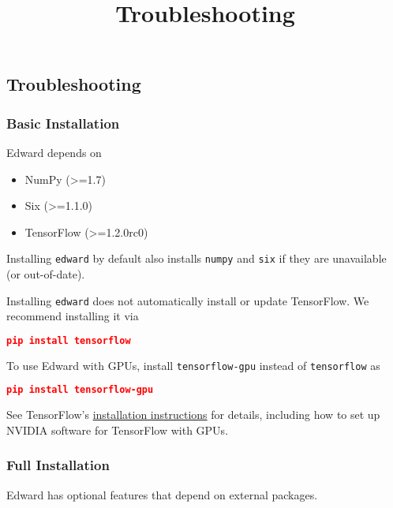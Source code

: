 \title{Troubleshooting}

\subsection{Troubleshooting}

\subsubsection{Basic Installation}

Edward depends on

\begin{itemize}
  \item NumPy (>=1.7)
  \item Six (>=1.1.0)
  \item TensorFlow (>=1.2.0rc0)
\end{itemize}

Installing \texttt{edward} by default also installs \texttt{numpy} and
\texttt{six} if they are unavailable (or out-of-date).

Installing \texttt{edward} does not automatically install or update
TensorFlow. We recommend installing it via

\begin{lstlisting}[language=JSON]
pip install tensorflow
\end{lstlisting}

To use Edward with GPUs, install \texttt{tensorflow-gpu} instead of
\texttt{tensorflow} as

\begin{lstlisting}[language=JSON]
pip install tensorflow-gpu
\end{lstlisting}

See TensorFlow's
\href{https://www.tensorflow.org/install/}{installation instructions}
for details, including how to set up NVIDIA software for TensorFlow with GPUs.

\subsubsection{Full Installation}

Edward has optional features that depend on external packages.

